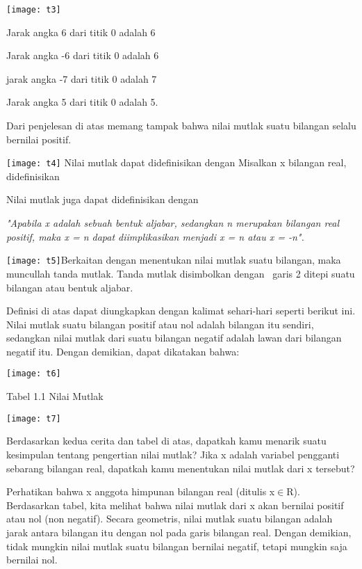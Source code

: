 \documentclass[11pt,fleqn]{book} %
\begin{document}
\noindent \texttt{[image: t3]}

\noindent Jarak angka 6 dari titik 0 adalah 6

\noindent Jarak angka -6 dari titik 0 adalah 6~

\noindent jarak angka -7 dari titik 0 adalah 7

\noindent Jarak angka 5 dari titik 0 adalah 5.

\noindent 

\noindent Dari penjelesan di atas memang tampak bahwa nilai mutlak suatu bilangan selalu bernilai positif.

\noindent \texttt{[image: t4]}  Nilai mutlak dapat didefinisikan dengan Misalkan x bilangan real, didefinisikan

\noindent 

\noindent Nilai mutlak juga dapat didefinisikan dengan 

\noindent \textit{"Apabila x adalah sebuah bentuk aljabar, sedangkan n merupakan bilangan real positif, maka {\textbar}x{\textbar} = n dapat diimplikasikan menjadi x = n atau x = -n". }

\noindent \texttt{[image: t5]}Berkaitan dengan menentukan nilai mutlak suatu bilangan, maka muncullah tanda mutlak. Tanda mutlak disimbolkan dengan~ garis 2 ditepi suatu bilangan atau bentuk aljabar.

\noindent 

\noindent Definisi di atas dapat diungkapkan dengan kalimat sehari-hari seperti berikut ini. Nilai mutlak suatu bilangan positif atau nol adalah bilangan itu sendiri, sedangkan nilai mutlak dari suatu bilangan negatif adalah lawan dari bilangan negatif itu. Dengan demikian, dapat dikatakan bahwa:

\noindent \texttt{[image: t6]}

\noindent Tabel 1.1 Nilai Mutlak

\noindent \texttt{[image: t7]}

\noindent 

 Berdasarkan kedua cerita dan tabel di atas, dapatkah kamu menarik suatu kesimpulan tentang pengertian nilai mutlak? Jika x adalah variabel pengganti sebarang bilangan real, dapatkah kamu menentukan nilai mutlak dari x tersebut?

  Perhatikan bahwa x anggota himpunan bilangan real (ditulis x$\mathrm{\in }$R). Berdasarkan tabel, kita melihat bahwa nilai mutlak dari x akan bernilai positif atau nol (non negatif). Secara geometris, nilai mutlak suatu bilangan adalah jarak antara bilangan itu dengan nol pada garis bilangan real. Dengan demikian, tidak mungkin nilai mutlak suatu bilangan bernilai negatif, tetapi mungkin saja bernilai nol. 
\end{document}
